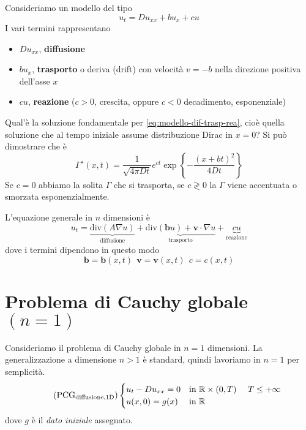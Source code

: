 \documentclass[10pt,a4paper,twoside,openright]{book}
\begin{document}
Consideriamo un modello del tipo
\begin{equation}
    u_{t} =Du_{xx} +bu_{x} +cu
    \label{eq:modello-dif-trasp-rea}
\end{equation}
I vari termini rappresentano
\begin{itemize}
    \item $Du_{xx}$, \textbf{diffusione}
    \item $bu_{x}$, \textbf{trasporto} o deriva (drift) con velocità $v=-b$ nella direzione positiva dell'asse $x$
    \item $cu$, \textbf{reazione} ($c >0$, crescita, oppure $c< 0$ decadimento, esponenziale)
\end{itemize}

Qual'è la soluzione fondamentale per \eqref{eq:modello-dif-trasp-rea}, cioè quella soluzione che al tempo iniziale assume distribuzione Dirac in $x=0$? Si può dimostrare che è
\begin{equation}
    \boxed{\Gamma ^{\star }(x,t) =\frac{1}{\sqrt{4\pi Dt}} e^{ct}\exp\left\{-\frac{(x+bt)^{2}}{4Dt}\right\}}
\end{equation}
Se $c=0$ abbiamo la solita $\Gamma $ che si trasporta, se $c\gtrless 0$ la $\Gamma $ viene accentuata o smorzata esponenzialmente.

L'equazione generale in $n$ dimensioni è
\begin{equation*}
    u_{t} = \underbrace{\mathrm{div}(A \nabla u)}_{\text{diffusione}} + \underbrace{\mathrm{div}(\mathbf{b} u) +\mathbf{v} \cdot\nabla u}_{\text{trasporto}} + \underbrace{cu}_{\text{reazione}}
\end{equation*}
dove i termini dipendono in questo modo
\begin{equation*}
    \mathbf{b} =\mathbf{b}(x,t) \ \ \mathbf{v} =\mathbf{v}(x,t) \ \ c=c(x,t)
\end{equation*}
\section{Problema di Cauchy globale \texorpdfstring{$(n=1)$}{n=1}}

Consideriamo il problema di Cauchy globale in $n=1$ dimensioni. La generalizzazione a dimensione $n >1$ è standard, quindi lavoriamo in $n=1$ per semplicità.
\begin{equation*}
    \tag{PCG$_{\text{diffusione,1D}}$}
    \begin{cases}
        u_{t} -Du_{xx} =0 & \text{in} \ \mathbb{R} \times (0,T) \ \ \ \ T\leqslant +\infty \\
        u(x,0) =g(x)      & \text{in} \ \mathbb{R}
    \end{cases}
    \label{eq:pcg-diffusione-1d}
\end{equation*}
dove $g$ è il \textit{dato iniziale} assegnato.
\end{document}
